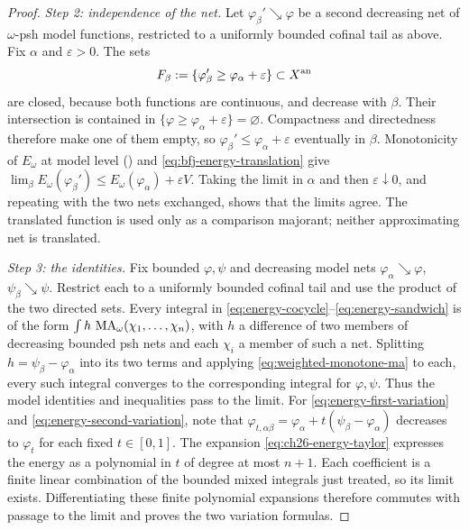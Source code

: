 \begin{proof}
\emph{Step 2: independence of the net.}  Let \(\varphi_\beta'\searrow\varphi\)
be a second decreasing net of \(\omega\)-psh model functions, restricted
to a uniformly bounded cofinal tail as above.  Fix
\(\alpha\) and \(\varepsilon>0\).  The sets
\[
 F_\beta:=\{\varphi_\beta'\geq\varphi_\alpha+\varepsilon\}\subset X^{\mathrm{an}}
\]
are closed, because both functions are continuous, and decrease with
\(\beta\).  Their intersection is contained in
\(\{\varphi\geq\varphi_\alpha+\varepsilon\}=\varnothing\).
Compactness and directedness therefore make one of them empty, so
\(\varphi_\beta'\leq\varphi_\alpha+\varepsilon\) eventually in \(\beta\).
Monotonicity of \(E_\omega\) at model level
() and
\eqref{eq:bfj-energy-translation} give
\(\lim_\beta E_\omega(\varphi_\beta')\leq
E_\omega(\varphi_\alpha)+\varepsilon V\).  Taking the limit in \(\alpha\)
and then \(\varepsilon\downarrow0\), and repeating with the two nets
exchanged, shows that the limits agree.  The translated function is used
only as a comparison majorant; neither approximating net is translated.

\emph{Step 3: the identities.}  Fix bounded \(\varphi,\psi\) and decreasing
model nets \(\varphi_\alpha\searrow\varphi\),
\(\psi_\beta\searrow\psi\).  Restrict each to a uniformly bounded cofinal
tail and use the product of the two directed sets.  Every integral in
\eqref{eq:energy-cocycle}--\eqref{eq:energy-sandwich} is of the form
\(\int h\,\operatorname{MA}_\omega(\chi_1,\ldots,\chi_n)\), with \(h\) a difference of
two members of decreasing bounded psh nets and each \(\chi_i\) a member
of such a net.  Splitting \(h=\psi_\beta-\varphi_\alpha\) into its two
terms and applying \eqref{eq:weighted-monotone-ma} to each, every such
integral converges to the corresponding integral for \(\varphi,\psi\).
Thus the model identities and inequalities pass to the limit.  For
\eqref{eq:energy-first-variation} and
\eqref{eq:energy-second-variation}, note that
\(\varphi_{t,\alpha\beta}=\varphi_\alpha+t(\psi_\beta-\varphi_\alpha)\)
decreases to \(\varphi_t\) for each fixed \(t\in[0,1]\).  The expansion
\eqref{eq:ch26-energy-taylor} expresses the energy as a polynomial in
\(t\) of degree at most \(n+1\).  Each coefficient is a finite linear
combination of the bounded mixed integrals just treated, so its limit
exists.  Differentiating these finite polynomial expansions therefore
commutes with passage to the limit and proves the two variation formulas.


\end{proof}
